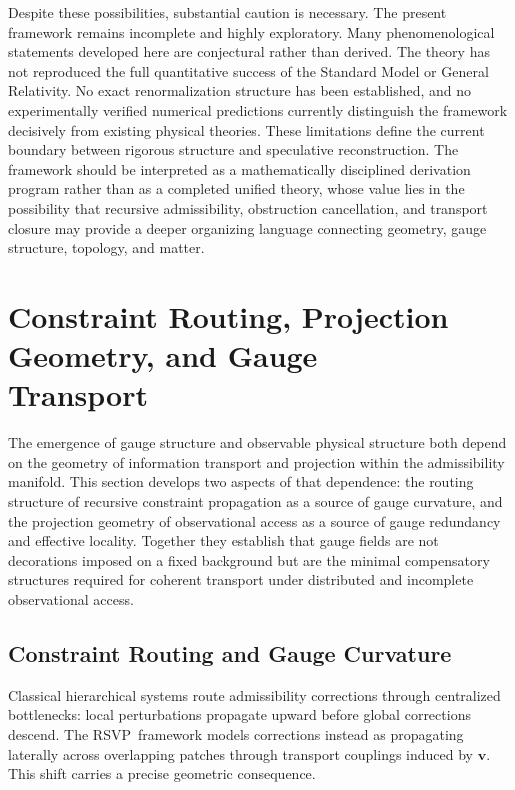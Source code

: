 \documentclass[12pt,a4paper]{article}
\newcommand{\RSVP}{\textrm{RSVP}}
\begin{document}
Despite these possibilities, substantial caution is necessary. The present
framework remains incomplete and highly exploratory. Many phenomenological
statements developed here are conjectural rather than derived. The theory has
not reproduced the full quantitative success of the Standard Model or General
Relativity. No exact renormalization structure has been established, and no
experimentally verified numerical predictions currently distinguish the framework
decisively from existing physical theories. These limitations define the current
boundary between rigorous structure and speculative reconstruction. The framework
should be interpreted as a mathematically disciplined derivation program rather
than as a completed unified theory, whose value lies in the possibility that
recursive admissibility, obstruction cancellation, and transport closure may
provide a deeper organizing language connecting geometry, gauge structure,
topology, and matter.

\section{Constraint Routing, Projection Geometry, and Gauge\\ Transport}

The emergence of gauge structure and observable physical structure both depend
on the geometry of information transport and projection within the admissibility
manifold. This section develops two aspects of that dependence: the routing
structure of recursive constraint propagation as a source of gauge curvature,
and the projection geometry of observational access as a source of gauge
redundancy and effective locality. Together they establish that gauge fields
are not decorations imposed on a fixed background but are the minimal
compensatory structures required for coherent transport under distributed
and incomplete observational access.

\subsection{Constraint Routing and Gauge Curvature}

Classical hierarchical systems route admissibility corrections through
centralized bottlenecks: local perturbations propagate upward before global
corrections descend. The \RSVP\ framework models corrections instead as
propagating laterally across overlapping patches through transport couplings
induced by $\mathbf{v}$. This shift carries a precise geometric consequence.
\end{document}

